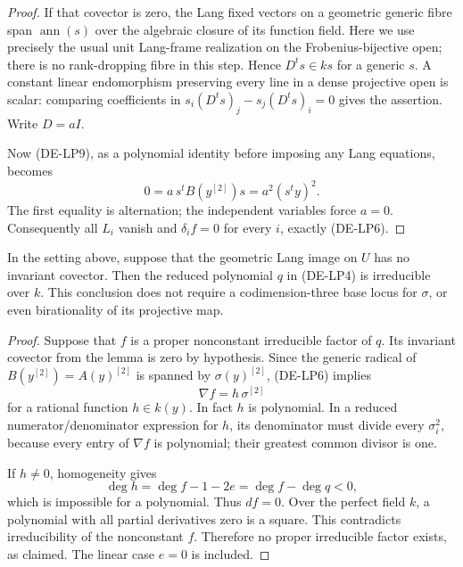 \begin{proof}
If that covector is zero, the Lang fixed vectors on a geometric
generic fibre span \(\operatorname{ann}(s)\) over the algebraic
closure of its function field. Here we use precisely the usual
unit Lang-frame realization on the Frobenius-bijective open;
there is no rank-dropping fibre in this step. Hence
\(D^t s\in ks\) for a generic \(s\). A constant linear
endomorphism preserving every line in a dense projective open
is scalar: comparing coefficients in
\(s_i(D^ts)_j-s_j(D^ts)_i=0\) gives the assertion. Write
\(D=aI\).

Now (DE-LP9), as a polynomial identity before imposing any Lang
equations, becomes
\[
 0=a\,s^tB(y^{[2]})s=a^2(s^ty)^2.
\]
The first equality is alternation; the independent variables
force \(a=0\). Consequently all \(L_i\) vanish and
\(\delta_i f=0\) for every \(i\), exactly (DE-LP6).
\end{proof}

\begin{theorem}
\label{thm:DE-Lang-polar-irreducible}
In the setting above, suppose that the geometric Lang image on
\(U\) has no invariant covector. Then the reduced polynomial
\(q\) in (DE-LP4) is irreducible over \(k\).
This conclusion does not require a codimension-three base locus
for \(\sigma\), or even birationality of its projective map.
\end{theorem}
\begin{proof}
Suppose that \(f\) is a proper nonconstant irreducible factor of
\(q\). Its invariant covector from the lemma is zero by hypothesis.
Since the generic radical of \(B(y^{[2]})=A(y)^{[2]}\) is
spanned by \(\sigma(y)^{[2]}\), (DE-LP6) implies
\[
                         \nabla f=h\,\sigma^{[2]}
 \tag{DE-LP10}
\]
for a rational function \(h\in k(y)\).
In fact \(h\) is polynomial. In a reduced numerator/denominator
expression for \(h\), its denominator must divide every
\(\sigma_i^2\), because every entry of \(\nabla f\) is
polynomial; their greatest common divisor is one.

If \(h\ne0\), homogeneity gives
\[
              \deg h=\deg f-1-2e=\deg f-\deg q<0,
\]
which is impossible for a polynomial. Thus \(df=0\).
Over the perfect field \(k\), a polynomial with all partial
derivatives zero is a square. This contradicts irreducibility of
the nonconstant \(f\). Therefore no proper irreducible factor
exists, as claimed. The linear case \(e=0\) is included.
\end{proof}

